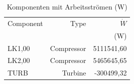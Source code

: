 \begin{longtable}{lrr}
\caption{Komponenten mit Arbeitsströmen (W)} \\
\hline
Component & Type & $\dot W$ \\
 &  & (W) \\
\hline
LK1,00 & Compressor & 5111541,60 \\
LK2,00 & Compressor & 5465645,65 \\
TURB & Turbine & -300499,32 \\
\hline
\end{longtable}
